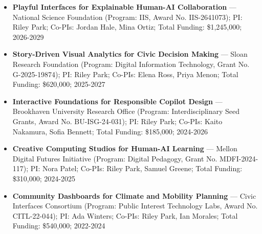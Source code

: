 %
%
%


\begin{itemize}
  \item \textbf{Playful Interfaces for Explainable Human-AI Collaboration} --- National Science Foundation (Program: IIS, Award No. IIS-2641073); PI: Riley Park; Co-PIs: Jordan Hale, Mina Ortiz; Total Funding: \$1,245,000; 2026-2029
  \item \textbf{Story-Driven Visual Analytics for Civic Decision Making} --- Sloan Research Foundation (Program: Digital Information Technology, Grant No. G-2025-19874); PI: Riley Park; Co-PIs: Elena Ross, Priya Menon; Total Funding: \$620,000; 2025-2027
  \item \textbf{Interactive Foundations for Responsible Copilot Design} --- Brookhaven University Research Office (Program: Interdisciplinary Seed Grants, Award No. BU-ISG-24-031); PI: Riley Park; Co-PIs: Kaito Nakamura, Sofia Bennett; Total Funding: \$185,000; 2024-2026
  \item \textbf{Creative Computing Studios for Human-AI Learning} --- Mellon Digital Futures Initiative (Program: Digital Pedagogy, Grant No. MDFI-2024-117); PI: Nora Patel; Co-PIs: Riley Park, Samuel Greene; Total Funding: \$310,000; 2024-2025
  \item \textbf{Community Dashboards for Climate and Mobility Planning} --- Civic Interfaces Consortium (Program: Public Interest Technology Labs, Award No. CITL-22-044); PI: Ada Winters; Co-PIs: Riley Park, Ian Morales; Total Funding: \$540,000; 2022-2024
\end{itemize}
